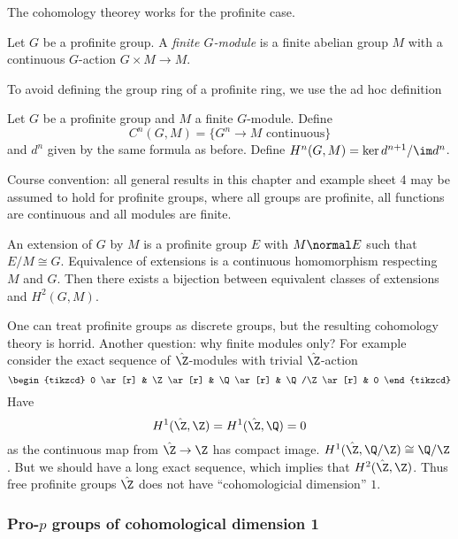 \documentclass[a4paper]{article}
\begin{document}
The cohomology theorey works for the profinite case.

\begin{definition}[\(G\)-module]
  Let \(G\) be a profinite group. A \emph{finite \(G\)-module} is a finite abelian group \(M\) with a continuous \(G\)-action \(G \times M \to M\).
\end{definition}

To avoid defining the group ring of a profinite ring, we use the ad hoc definition

\begin{definition}
  Let \(G\) be a profinite group and \(M\) a finite \(G\)-module. Define
  \[
    C^n(G, M) = \{G^n \to M \text{ continuous}\}
  \]
  and \(d^n\) given by the same formula as before. Define \(H^n(G, M) = \ker d^{n + 1}/\im d^n\).
\end{definition}

Course convention: all general results in this chapter and example sheet 4 may be assumed to hold for profinite groups, where all groups are profinite, all functions are continuous and all modules are finite.

\begin{eg}
  An extension of \(G\) by \(M\) is a profinite group \(E\) with \(M \normal E\) such that \(E/M \cong G\). Equivalence of extensions is a continuous homomorphism respecting \(M\) and \(G\). Then there exists a bijection between equivalent classes of extensions and \(H^2(G, M)\).
\end{eg}

One can treat profinite groups as discrete groups, but the resulting cohomology theory is horrid. Another question: why finite modules only? For example consider the exact sequence of \(\hat \Z\)-modules with trivial \(\hat \Z\)-action
\[
  \begin{tikzcd}
    0 \ar[r] & \Z \ar[r] & \Q \ar[r] & \Q/\Z \ar[r] & 0
  \end{tikzcd}
\]
Have
\[
  H^1(\hat \Z, \Z) = H^1(\hat \Z, \Q) = 0
\]
as the continuous map from \(\hat \Z \to \Z\) has compact image. \(H^1(\hat \Z, \Q/\Z) \cong \Q/\Z\). But we should have a long exact sequence, which implies that \(H^2(\hat \Z, \Z)\). Thus free profinite groups \(\hat \Z\) does not have ``cohomologicial dimension'' \(1\).

\subsubsection{Pro-\(p\) groups of cohomological dimension 1}
\end{document}
